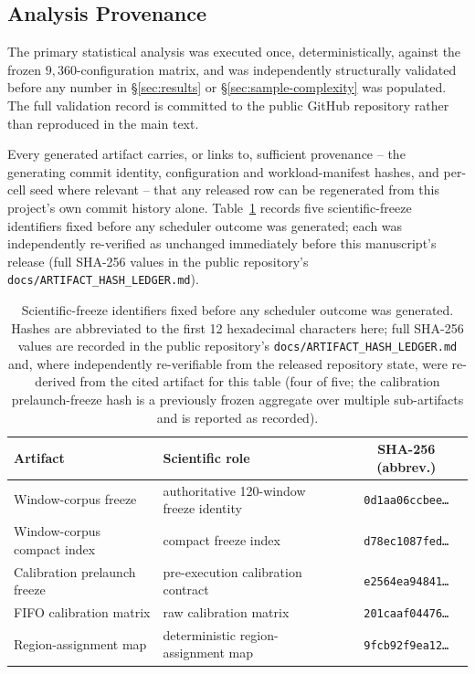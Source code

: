 \subsection{Analysis Provenance}
\label{sec:artifact-hashes}

The primary statistical analysis was executed once, deterministically,
against the frozen $9{,}360$-configuration matrix, and was independently
structurally validated before any number in \S\ref{sec:results} or
\S\ref{sec:sample-complexity} was populated. The full validation record is
committed to the public GitHub repository rather than reproduced in the
main text.

Every generated artifact carries, or links to, sufficient provenance --
the generating commit identity, configuration and workload-manifest
hashes, and per-cell seed where relevant -- that any released row can be
regenerated from this project's own commit history alone. Table~\ref{tab:hashes}
records five scientific-freeze identifiers fixed before any scheduler
outcome was generated; each was independently re-verified as unchanged
immediately before this manuscript's release (full SHA-256 values in the
public repository's \texttt{docs/ARTIFACT\_HASH\_LEDGER.md}).

\begin{table}[t]
\centering
\caption{Scientific-freeze identifiers fixed before any scheduler outcome
was generated. Hashes are abbreviated to the first 12 hexadecimal
characters here; full SHA-256 values are recorded in the public
repository's \texttt{docs/ARTIFACT\_HASH\_LEDGER.md} and, where independently re-verifiable
from the released repository state, were re-derived from the cited
artifact for this table (four of five; the calibration prelaunch-freeze
hash is a previously frozen aggregate over multiple sub-artifacts and is
reported as recorded).}
\label{tab:hashes}
\begin{tabular}{llc}
\toprule
Artifact & Scientific role & SHA-256 (abbrev.) \\
\midrule
Window-corpus freeze & authoritative 120-window freeze identity & \texttt{0d1aa06ccbee\ldots} \\
Window-corpus compact index & compact freeze index & \texttt{d78ec1087fed\ldots} \\
Calibration prelaunch freeze & pre-execution calibration contract & \texttt{e2564ea94841\ldots} \\
FIFO calibration matrix & raw calibration matrix & \texttt{201caaf04476\ldots} \\
Region-assignment map & deterministic region-assignment map & \texttt{9fcb92f9ea12\ldots} \\
\bottomrule
\end{tabular}
\end{table}
